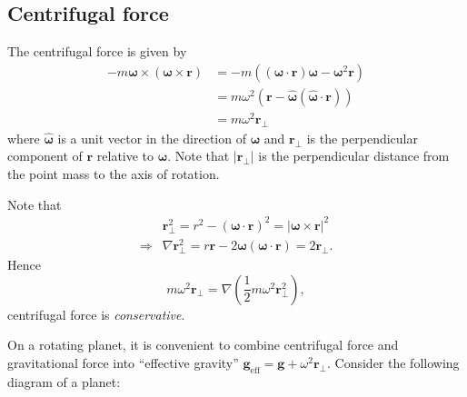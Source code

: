 \subsection{Centrifugal force}
The centrifugal force is given by 
\begin{align*}
    -m\boldsymbol{\omega} \times (\boldsymbol{\omega} \times \mathbf{r}) &= -m((\boldsymbol{\omega}\cdot \mathbf{r})\boldsymbol{\omega}-\boldsymbol{\omega}^2 \mathbf{r})\\ 
    &= m \omega^2(\mathbf{r} - \hat{\boldsymbol{\omega}}(\hat{\boldsymbol{\omega}} \cdot \mathbf{r}))\\ 
    &= m \omega^2 \mathbf{r}_{\perp}
\end{align*}
where $ \hat{\boldsymbol{\omega}} $ is a unit vector in the direction of $ \boldsymbol{\omega} $ and $ \mathbf{r}_{\perp } $ is the perpendicular component of $ \mathbf{r} $ relative to $ \boldsymbol{\omega} $. Note that $ |\mathbf{r}_{\perp }|  $ is the perpendicular distance from the point mass to the axis of rotation.
\begin{center}
\end{center}
Note that
\begin{align*}
    & \mathbf{r}_\perp^2 = r^2-(\boldsymbol{\omega}\cdot \mathbf{r})^2 = |\boldsymbol{\omega}\times \mathbf{r}|^2\\ 
    \Longrightarrow & \nabla \mathbf{r}_\perp^2 = r \mathbf{r} - 2 \boldsymbol{\omega} (\boldsymbol{\omega}\cdot \mathbf{r}) = 2 \mathbf{r}_\perp.
\end{align*}
Hence 
\[
    m \omega^2 \mathbf{r}_{\perp} = \nabla \left( \frac{1}{2}m \omega^2 \mathbf{r}_\perp^2 \right),
\]
centrifugal force is \textit{conservative}. 

On a rotating planet, it is convenient to combine centrifugal force and gravitational force into ``effective gravity'' $ \mathbf{g}_{\text{eff}}=\mathbf{g}+\omega^2 \mathbf{r}_\perp  $. Consider the following diagram of a planet:
\begin{center}
\end{center}

